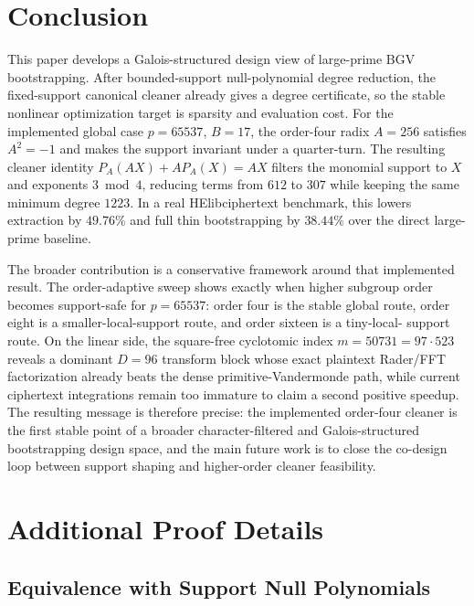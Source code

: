 \documentclass[a4paper,runningheads]{llncs}
\newcommand{\HElib}{\textsf{HElib}}
\newcommand{\BGV}{\textsf{BGV}}
\begin{document}
\section{Conclusion}
\label{sec:conclusion}

This paper develops a Galois-structured design view of large-prime \BGV
bootstrapping. After bounded-support null-polynomial degree reduction, the
fixed-support canonical cleaner already gives a degree certificate, so the
stable nonlinear optimization target is sparsity and evaluation cost. For the
implemented global case $p=65537$, $B=17$, the order-four radix $A=256$
satisfies $A^2=-1$ and makes the support invariant under a quarter-turn. The
resulting cleaner identity $P_A(AX)+AP_A(X)=AX$ filters the monomial support to
$X$ and exponents $3\bmod4$, reducing terms from $612$ to $307$ while keeping
the same minimum degree $1223$. In a real \HElib ciphertext benchmark, this
lowers extraction by $49.76\%$ and full thin bootstrapping by $38.44\%$ over
the direct large-prime baseline.

The broader contribution is a conservative framework around that implemented
result. The order-adaptive sweep shows exactly when higher subgroup order
becomes support-safe for $p=65537$: order four is the stable global route,
order eight is a smaller-local-support route, and order sixteen is a tiny-local-
support route. On the linear side, the square-free cyclotomic index
$m=50731=97\cdot523$ reveals a dominant $D=96$ transform block whose exact
plaintext Rader/FFT factorization already beats the dense primitive-Vandermonde
path, while current ciphertext integrations remain too immature to claim a
second positive speedup. The resulting message is therefore precise: the
implemented order-four cleaner is the first stable point of a broader
character-filtered and Galois-structured bootstrapping design space, and the
main future work is to close the co-design loop between support shaping and
higher-order cleaner feasibility.

\appendix

\section{Additional Proof Details}
\label{app:proofs}

\subsection{Equivalence with Support Null Polynomials}
\end{document}
